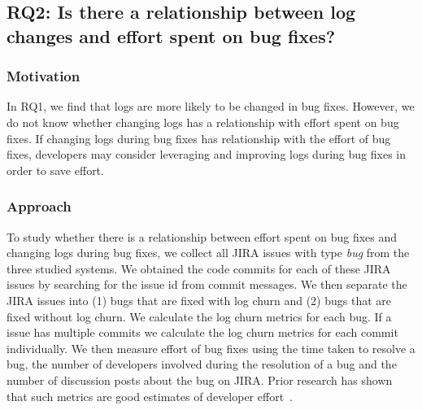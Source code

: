 \subsection*{RQ2: Is there a relationship between log changes and effort spent on bug fixes?}


\subsubsection*{Motivation}

In RQ1, we find that logs are more likely to be changed in bug fixes. However, we do not know whether changing logs has a relationship with effort spent on bug fixes. If changing logs during bug fixes has relationship with the effort of bug fixes, developers may consider leveraging and improving logs during bug fixes in order to save effort.

\subsubsection*{Approach}



To study whether there is a relationship between effort spent on bug fixes and changing logs during bug fixes, we collect all JIRA issues with type \emph{bug} from the three studied systems. We obtained the code commits for each of these JIRA issues by searching for the issue id from commit messages. We then separate the JIRA issues into (1) bugs that are fixed with log churn and (2) bugs that are fixed without log churn. We calculate the log churn metrics for each bug. If a issue has multiple commits we calculate the log churn metrics for each commit individually. We then measure effort of bug fixes using the time taken to resolve a bug, the number of developers involved during the resolution of a bug and the number of discussion posts about the bug on JIRA. Prior research has shown that such metrics are good estimates of developer effort~\cite{amor2006effort}. 

